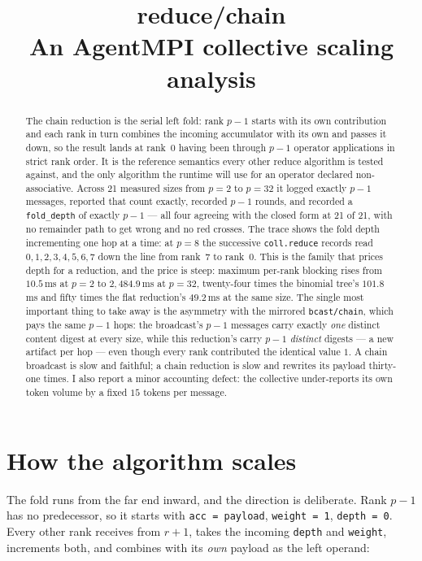 \documentclass[11pt]{article}
\title{\textbf{reduce/chain}\\[2pt]\large An AgentMPI collective scaling analysis}
\author{}
\date{}
\begin{document}
\maketitle

\begin{abstract}
The chain reduction is the serial left fold: rank $p-1$ starts with its own contribution and
each rank in turn combines the incoming accumulator with its own and passes it down, so the
result lands at rank~0 having been through $p-1$ operator applications in strict rank order.
It is the reference semantics every other reduce algorithm is tested against, and the only
algorithm the runtime will use for an operator declared non-associative. Across 21 measured
sizes from $p=2$ to $p=32$ it logged exactly $p-1$ messages, reported that count exactly,
recorded $p-1$ rounds, and recorded a \texttt{fold\_depth} of exactly $p-1$ --- all four
agreeing with the closed form at 21 of 21, with no remainder path to get wrong and no red
crosses. The trace shows the fold depth incrementing one hop at a time: at $p=8$ the successive
\texttt{coll.reduce} records read $0, 1, 2, 3, 4, 5, 6, 7$ down the line from rank~7 to rank~0.
This is the family that prices depth for a reduction, and the price is steep: maximum per-rank
blocking rises from $10.5$\,ms at $p=2$ to $2{,}484.9$\,ms at $p=32$, twenty-four times the
binomial tree's $101.8$\,ms and fifty times the flat reduction's $49.2$\,ms at the same size.
The single most important thing to take away is the asymmetry with the mirrored
\texttt{bcast/chain}, which pays the same $p-1$ hops: the broadcast's $p-1$ messages carry
exactly \emph{one} distinct content digest at every size, while this reduction's carry $p-1$
\emph{distinct} digests --- a new artifact per hop --- even though every rank contributed the
identical value $1$. A chain broadcast is slow and faithful; a chain reduction is slow and
rewrites its payload thirty-one times. I also report a minor accounting defect: the collective
under-reports its own token volume by a fixed $15$ tokens per message.
\end{abstract}



\section{How the algorithm scales}

The fold runs from the far end inward, and the direction is deliberate. Rank $p-1$ has no
predecessor, so it starts with \texttt{acc = payload}, \texttt{weight = 1},
\texttt{depth = 0}. Every other rank receives from $r+1$, takes the incoming
\texttt{depth} and \texttt{weight}, increments both, and combines with its \emph{own} payload as
the left operand:
\end{document}

